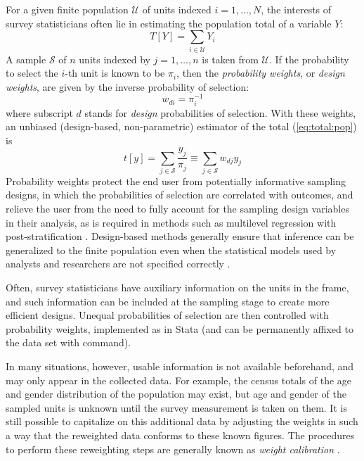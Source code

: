 For a given finite population $\mathcal U$ of units indexed $i=1,\ldots,N$,
the interests of survey statisticians often lie in estimating the
population total of a variable $Y$:
\begin{equation}
   T[Y] = \sum_{i \in \mathcal{U}} Y_i
   \label{eq:total:pop}
\end{equation}
A sample $\mathcal S$ of $n$ units indexed by $j=1,\ldots,n$
is taken from $\mathcal U$. If the probability to select the
$i$-th unit is known to be $\pi_i$, then
the {\it probability weights}, or {\it design weights}, are given by
the inverse probability of selection:
\begin{equation}
   w_{di} = \pi_i^{-1}
   \label{eq:prob:weight}
\end{equation}
where subscript $d$ stands for \textit{design} probabilities of selection.
With these weights, an unbiased
(design-based, non-parametric) estimator
of the total (\ref{eq:total:pop}) is \citep{horvitz:thompson:1952}
\begin{equation}
   t[y] = \sum_{j \in \mathcal{S}} \frac{y_j}{\pi_j}
   \equiv \sum_{j \in \mathcal{S}} w_{dj} y_j
   \label{eq:total:sample}
\end{equation}
Probability weights protect
the end user from potentially informative sampling designs, in which
the probabilities of selection are correlated with outcomes, and
relieve the user from the need to fully account for the sampling design
variables in their analysis, as is required in methods such 
as multilevel regression with post-stratification \citep{gelman:mrp}.
Design-based methods generally ensure that inference can be generalized
to the finite population even when the statistical models used
by analysts and researchers are not specified correctly
\citep{pfeff:1993,binder:roberts:2003}.

Often, survey statisticians have auxiliary information on the units
in the frame, and such information can be included at the sampling stage
to create more efficient designs. Unequal probabilities of selection
are then controlled with probability weights, implemented
as \stcmd{[pw=}{\it exp}\stcmd{]} in Stata (and can be permanently
affixed to the data set with  command).

In many situations, however, usable information is not available beforehand,
and may only appear in the collected data. For example, the census totals of the age and gender
distribution of the population may exist, but age and gender of
the sampled units is unknown until the survey measurement is taken on them.
It is still possible to capitalize on this additional data by
adjusting the weights in such a way that the reweighted data
conforms to these known figures. The procedures to perform these
reweighting steps are generally known as {\it weight calibration}
\citep{deville:sarndal:1992,deville:sarndal:sautory:1993,%
kott:2006,kott:2009,sarndal:2007}.


